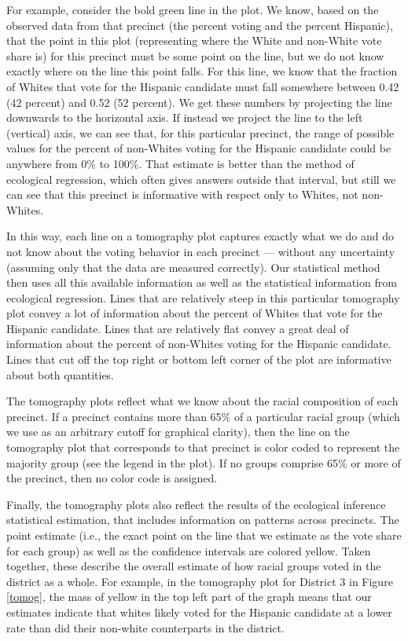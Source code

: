 \documentclass[12pt]{article}
\begin{document}
For example, consider the bold green line in the plot. We know, based
on the observed data from that precinct (the percent voting and the
percent Hispanic), that the point in this plot (representing where the
White and non-White vote share is) for this precinct must be some
point on the line, but we do not know exactly where on the line this
point falls. For this line, we know that the fraction of Whites that
vote for the Hispanic candidate must fall somewhere between 0.42 (42
percent) and 0.52 (52 percent). We get these numbers by projecting the
line downwards to the horizontal axis. If instead we project the line
to the left (vertical) axis, we can see that, for this particular
precinct, the range of possible values for the percent of non-Whites
voting for the Hispanic candidate could be anywhere from 0\% to 100\%.
That estimate is better than the method of ecological regression,
which often gives answers outside that interval, but still we can see
that this precinct is informative with respect only to Whites, not
non-Whites. 

In this way, each line on a tomography plot captures exactly what we
do and do not know about the voting behavior in each precinct ---
without any uncertainty (assuming only that the data are measured
correctly). Our statistical method then uses all this available
information as well as the statistical information from ecological
regression. Lines that are relatively steep in this particular
tomography plot convey a lot of information about the percent of
Whites that vote for the Hispanic candidate.  Lines that are
relatively flat convey a great deal of information about the percent
of non-Whites voting for the Hispanic candidate.  Lines that cut off
the top right or bottom left corner of the plot are informative about
both quantities.

The tomography plots reflect what we know about the racial composition
of each precinct. If a precinct contains more than 65\% of a
particular racial group (which we use as an arbitrary cutoff for
graphical clarity), then the line on the tomography plot that
corresponds to that precinct is color coded to represent the majority
group (see the legend in the plot). If no groups comprise 65\% or more
of the precinct, then no color code is assigned.  

Finally, the tomography plots also reflect the results of the
ecological inference statistical estimation, that includes information
on patterns across precincts. The point estimate (i.e., the exact
point on the line that we estimate as the vote share for each group)
as well as the confidence intervals are colored yellow.  Taken
together, these describe the overall estimate of how racial groups
voted in the district as a whole. For example, in the tomography plot
for District 3 in Figure \ref{tomog}, the mass of yellow in the top
left part of the graph means that our estimates indicate that whites
likely voted for the Hispanic candidate at a lower rate than did their
non-white counterparts in the district.
\end{document}
